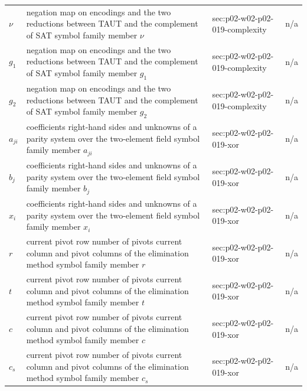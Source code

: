 \begin{longtable}{@{}p{}p{}p{}p{}@{}}
\(\nu\) & negation map on encodings and the two reductions between TAUT and the complement of SAT symbol family member \(\nu\) & sec:\allowbreak{}p02-\allowbreak{}w02-\allowbreak{}p02-\allowbreak{}019-\allowbreak{}complexity & n/a \\
\(g_1\) & negation map on encodings and the two reductions between TAUT and the complement of SAT symbol family member \(g_1\) & sec:\allowbreak{}p02-\allowbreak{}w02-\allowbreak{}p02-\allowbreak{}019-\allowbreak{}complexity & n/a \\
\(g_2\) & negation map on encodings and the two reductions between TAUT and the complement of SAT symbol family member \(g_2\) & sec:\allowbreak{}p02-\allowbreak{}w02-\allowbreak{}p02-\allowbreak{}019-\allowbreak{}complexity & n/a \\
\(a_{ji}\) & coefficients right-hand sides and unknowns of a parity system over the two-element field symbol family member \(a_{ji}\) & sec:\allowbreak{}p02-\allowbreak{}w02-\allowbreak{}p02-\allowbreak{}019-\allowbreak{}xor & n/a \\
\(b_j\) & coefficients right-hand sides and unknowns of a parity system over the two-element field symbol family member \(b_j\) & sec:\allowbreak{}p02-\allowbreak{}w02-\allowbreak{}p02-\allowbreak{}019-\allowbreak{}xor & n/a \\
\(x_i\) & coefficients right-hand sides and unknowns of a parity system over the two-element field symbol family member \(x_i\) & sec:\allowbreak{}p02-\allowbreak{}w02-\allowbreak{}p02-\allowbreak{}019-\allowbreak{}xor & n/a \\
\(r\) & current pivot row number of pivots current column and pivot columns of the elimination method symbol family member \(r\) & sec:\allowbreak{}p02-\allowbreak{}w02-\allowbreak{}p02-\allowbreak{}019-\allowbreak{}xor & n/a \\
\(t\) & current pivot row number of pivots current column and pivot columns of the elimination method symbol family member \(t\) & sec:\allowbreak{}p02-\allowbreak{}w02-\allowbreak{}p02-\allowbreak{}019-\allowbreak{}xor & n/a \\
\(c\) & current pivot row number of pivots current column and pivot columns of the elimination method symbol family member \(c\) & sec:\allowbreak{}p02-\allowbreak{}w02-\allowbreak{}p02-\allowbreak{}019-\allowbreak{}xor & n/a \\
\(c_s\) & current pivot row number of pivots current column and pivot columns of the elimination method symbol family member \(c_s\) & sec:\allowbreak{}p02-\allowbreak{}w02-\allowbreak{}p02-\allowbreak{}019-\allowbreak{}xor & n/a \\

\end{longtable}
